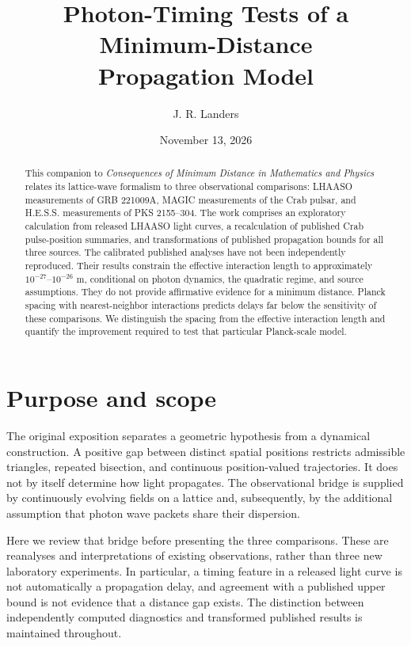\documentclass[11pt]{article}
\title{Photon-Timing Tests of a Minimum-Distance\\Propagation Model}
\author{J. R. Landers}
\date{November 13, 2026}
\begin{document}
\maketitle
\begin{abstract}
This companion to \emph{Consequences of Minimum Distance in Mathematics and Physics} relates its lattice-wave formalism to three observational comparisons: LHAASO measurements of GRB 221009A, MAGIC measurements of the Crab pulsar, and H.E.S.S. measurements of PKS 2155--304. The work comprises an exploratory calculation from released LHAASO light curves, a recalculation of published Crab pulse-position summaries, and transformations of published propagation bounds for all three sources. The calibrated published analyses have not been independently reproduced. Their results constrain the effective interaction length to approximately $10^{-27}$--$10^{-26}$ m, conditional on photon dynamics, the quadratic regime, and source assumptions. They do not provide affirmative evidence for a minimum distance. Planck spacing with nearest-neighbor interactions predicts delays far below the sensitivity of these comparisons. We distinguish the spacing from the effective interaction length and quantify the improvement required to test that particular Planck-scale model.
\end{abstract}

\section{Purpose and scope}
The original exposition \cite{landers} separates a geometric hypothesis from a dynamical construction. A positive gap between distinct spatial positions restricts admissible triangles, repeated bisection, and continuous position-valued trajectories. It does not by itself determine how light propagates. The observational bridge is supplied by continuously evolving fields on a lattice and, subsequently, by the additional assumption that photon wave packets share their dispersion.

Here we review that bridge before presenting the three comparisons. These are reanalyses and interpretations of existing observations, rather than three new laboratory experiments. In particular, a timing feature in a released light curve is not automatically a propagation delay, and agreement with a published upper bound is not evidence that a distance gap exists. The distinction between independently computed diagnostics and transformed published results is maintained throughout.
\end{document}
